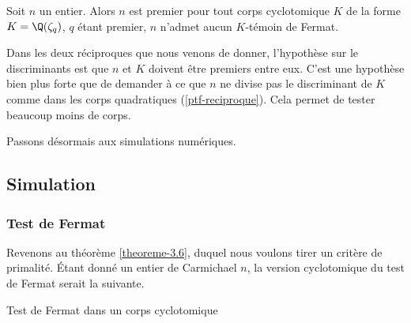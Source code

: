 \begin{theoreme}
	Soit $n$ un entier. Alors $n$ est premier \ssi pour tout corps cyclotomique $K$ de la forme $K = \Q(\zeta_q)$, $q$ étant premier, $n$ n'admet aucun $K$-témoin de Fermat.
\end{theoreme}

\begin{remarque}
	Dans les deux réciproques que nous venons de donner, l'hypothèse sur le discriminants est que $n$ et $K$ doivent être premiers entre eux. C'est une hypothèse bien plus forte que de demander à ce que $n$ ne divise pas le discriminant de $K$ comme dans les corps quadratiques (\ref{ptf-reciproque}). Cela permet de tester beaucoup moins de corps.
\end{remarque}

Passons désormais aux simulations numériques.

\subsection{Simulation}

\subsubsection{Test de Fermat}

Revenons au théorème \ref{theoreme-3.6}, duquel nous voulons tirer un critère de primalité. Étant donné un entier de Carmichael $n$, la version \og cyclotomique \fg{} du test de Fermat serait la suivante.

\vspace{1em}
\begin{algorithm}[H]\label{test-Fermat-cyclotomique}
\caption{Test de Fermat dans un corps cyclotomique}
\end{algorithm}
\vspace{1em}

